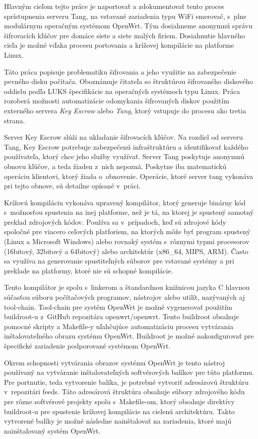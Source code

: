Hlavným cieľom tejto práce je naportovať a zdokumentovať tento proces sprístupnenia serveru Tang, na vstavané zariadenia typu WiFi smerovač, s~plne modulárnym operačným systémom OpenWrt.
Tým dosiahneme anonymnú správu šifrovacích kľúčov pre domáce siete a siete malých firiem.
Dosiahnutie hlavného cieľa je možné vďaka procesu portovania a krížovej kompilácie na platforme Linux.

Táto práca popisuje problematiku šifrovania a jeho využitie na zabezpečenie pevného disku počítača.
Oboznámuje čitateľa so štruktúrou šifrovaného diskového oddielu podľa LUKS špecifikácie na operačných systémoch typu Linux.
Práca rozoberá možnosti automatizácie odomykania šifrovaných diskov použitím externého servera {\it Key Escrow} alebo {\it Tang}, ktorý vstupuje do procesu ako tretia strana.

Server Key Escrow slúži na ukladanie šifrovacích kľúčov.
Na rozdiel od serveru Tang, Key Escrow potrebuje zabezpečenú infraštruktúru a identifikovať každého používateľa, ktorý chce jeho služby využívať.
Server Tang poskytuje anonymnú obnovu kľúčov, a teda žiaden z~nich nepozná. Poskytne iba matematickú operáciu klientovi, ktorý žiada o~obnovenie.
Operácie, ktoré server tang vykonáva pri tejto obnove, sú detailne opísané v~práci.

Krížovú kompiláciu vykonáva upravený kompilátor, ktorý generuje binárny kód s mož\-nos\-ťou spustenia na inej platforme, než je tá, na ktorej je spustený samotný preklad zdrojových kódov.
Používa sa v~prípadoch, keď sú zdrojové kódy spoločné pre viacero ceľových platforiem, na ktorých môže byť program spustený (Linux a Microsoft Windows) alebo rovnaký systém s~rôznymi typmi procesorov (16bitový, 32bitový a 64bitový) alebo architektúr (x86\_64, MIPS, ARM).
Často sa využíva na generovanie spustiteľných súborov pre vstavané systémy a pri preklade na platformy, ktoré nie sú schopné kompilácie.

Tento kompilátor je spolu s~linkerom a štandardnou knižnicou jazyka C hlavnou súčasťou súboru počítačových programov, nástrojov alebo utilít, nazývaných aj tool-chain.
Tool-chain pre systém OpenWrt je možné vygenerovať použitím buildroot-u z~GitHub repozitára openwrt/openwrt.
Tento buildroot obsahuje pomocné skripty a Makefile-y uľahčujúce automatizáciu procesu vytvárania inštalovateľného obrazu systému OpenWrt.
Buildroot je možné nakonfigurovať pre špecifické zariadenie podporované systémom OpenWrt.

Okrem schopnosti vytvárania obrazov systému OpenWrt je tento nástroj používaný na vytváranie inštalovateľných softvérových balíkov pre túto platformu.
Pre portnutie, teda vytvorenie balíka, je potrebné vytvoriť adresárovú štruktúru v~repozitári feeds.
Táto adresárová štruktúra obsahuje súbory zdrojového kódu pre rôzne softvérové projekty spolu s~Makefile-om, ktorý obsahuje direktívy buildroot-u pre spustenie krížovej kompilácie na cielenú architektúru.
Takto vytvorené balíky je možné následne nainštalovať na zariadenia, ktoré majú nainštalovaný systém OpenWrt.


